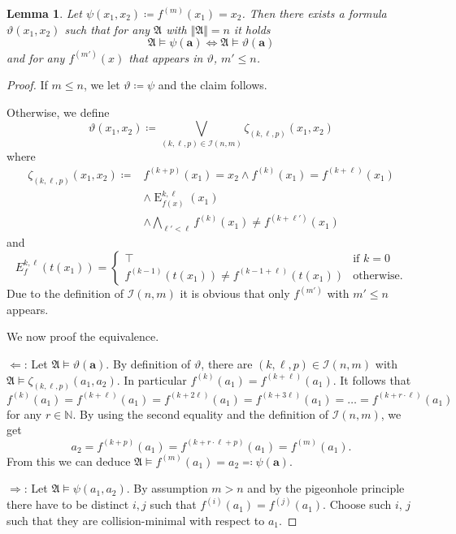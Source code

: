 \documentclass[a4paper,11pt,DIV=15]{scrartcl} %
\theoremstyle{plain}
\newtheorem{lemma}[theorem]{Lemma}
\theoremstyle{definition}
\renewcommand{\theta}{\vartheta}
\begin{document}
\begin{lemma}
	Let $\psi(x_1,x_2)\coloneqq f^{(m)}(x_1)=x_2$. 
	Then there exists a formula $\theta(x_1,x_2)$ such that for any $\mathfrak A$ with $\Vert \mathfrak A\Vert=n$ it holds
	$$\mathfrak A \models \psi(\mathbf a) \Longleftrightarrow \mathfrak A \models \theta(\mathbf a)$$ 
	and for any $f^{(m')}(x)$ that appears in $\theta$, $m'\leq n$.
	\label{Simple_fm_to_fk}
\end{lemma}
\begin{proof}
	If $m \leq n$, we let $\theta\coloneqq\psi$ and the claim follows.
	
	Otherwise, we define
	$$\theta(x_1,x_2)\coloneqq \bigvee_{(k,\ell,p)\in \mathcal I(n,m)} \zeta_{(k,\ell,p)}(x_1,x_2)$$
	where
	\begin{align*}
		\zeta_{(k,\ell,p)}(x_1,x_2)\coloneqq & f^{(k+p)}(x_1)=x_2 \land f^{(k)}(x_1)=f^{(k+\ell)}(x_1) \\
		& \land \operatorname{E}^{k,\ell}_{f(x)}(x_1)  \\
		& \land \bigwedge_{\ell'<\ell}f^{(k)}(x_1)\neq f^{(k+\ell')}(x_1)
	\end{align*}
	and
	$$E^{k,\ell}_{f}(t(x_1))=\begin{cases}
		\top & \text{if } k=0 \\
		f^{(k-1)}(t(x_1))\neq f^{(k-1+\ell)}(t(x_1)) & \text{otherwise}.
	\end{cases}$$
	Due to the definition of $\mathcal I(n,m)$ it is obvious that only $f^{(m')}$ with $m'\leq n$ appears.
	
	We now proof the equivalence.
	
	$\Longleftarrow$: Let $\mathfrak A \models \theta(\mathbf a)$. 
	By definition of $\theta$, there are $(k,\ell,p)\in \mathcal I(n,m)$ with $\mathfrak A \models \zeta_{(k,\ell,p)}(a_1,a_2)$.
	In particular $f^{(k)}(a_1)=f^{(k+\ell)}(a_1)$. It follows that
	$$f^{(k)}(a_1)=f^{(k+\ell)}(a_1)=f^{(k+2\ell)}(a_1)=f^{(k+3\ell)}(a_1) = \dots = f^{(k+r\cdot \ell)}(a_1)$$
	for any $r\in \mathbb N$. By using the second equality and the definition of $\mathcal{I}(n,m)$, we get
	$$a_2 =f^{(k+p)}(a_1) = f^{(k+r\cdot \ell + p)}(a_1)=f^{(m)}(a_1).$$
	From this we can deduce $\mathfrak A\models f^{(m)}(a_1)=a_2 \eqqcolon \psi(\mathbf a)$.
	
	$\Longrightarrow$: Let $\mathfrak A\models \psi(a_1,a_2)$. By assumption $m>n$ and by the pigeonhole principle there have to be distinct $i, j$ such that $f^{(i)}(a_1)=f^{(j)}(a_1)$.
	Choose such $i$, $j$ such that they are collision-minimal with respect to $a_1$.
	

\end{proof}
\end{document}
